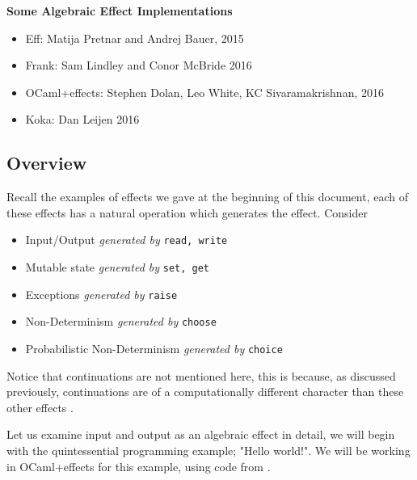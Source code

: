 \textbf{Some Algebraic Effect Implementations}
\begin{itemize}
    \item Eff: Matija Pretnar and Andrej Bauer,
        2015\cite{bauer2015programming}
    \item Frank: Sam Lindley and Conor McBride
        2016\cite{Lindley:2016vz}
    \item OCaml+effects: Stephen Dolan, Leo White, KC Sivaramakrishnan,
        2016\cite{ocamlplseff}
    \item Koka: Dan Leijen
        2016\cite{leijen:16}
\end{itemize}

\subsection{Overview}
\begin{example}
    Recall the examples of effects we gave at the beginning of this document,
    each of these effects has a natural operation which generates the effect.
    Consider
    \begin{itemize}
        \item Input/Output \textit{generated by} \texttt{read, write}
        \item Mutable state \textit{generated by} \texttt{set, get}
        \item Exceptions \textit{generated by} \texttt{raise}
        \item Non-Determinism \textit{generated by} \texttt{choose}
        \item Probabilistic Non-Determinism \textit{generated by} \texttt{choice}
    \end{itemize}
\end{example}

Notice that continuations are not mentioned here,
this is because, as discussed previously,
continuations are of a computationally different character
than these other effects
\cite{Plotkin:2002dw}\cite{hyland2007combining}.

Let us examine input and output as an algebraic effect in detail,
we will begin with the quintessential programming example; "Hello world!".
We will be working in OCaml+effects\cite{ocamlplseff} for this example,
using code from \cite{kceff}.\\

